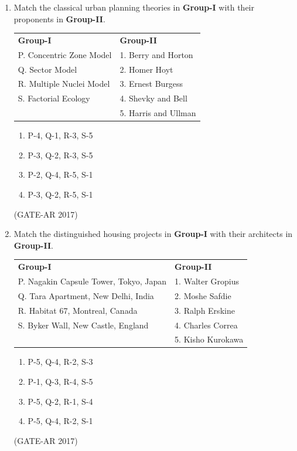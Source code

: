 \documentclass[a4paper,10pt]{article}
\begin{document}
\begin{enumerate}
    \item Match the classical urban planning theories in \textbf{Group-I} with their proponents in \textbf{Group-II}. \\
    \begin{tabular}{ l l }
	\textbf{Group-I} & \textbf{Group-II} \\
	P. Concentric Zone Model & 1. Berry and Horton \\
	Q. Sector Model & 2. Homer Hoyt \\
	R. Multiple Nuclei Model & 3. Ernest Burgess \\
	S. Factorial Ecology & 4. Shevky and Bell \\
	& 5. Harris and Ullman \\
	\end{tabular}
	\begin{multicols}{2}
	\begin{enumerate}
        \item P-4, Q-1, R-3, S-5
        \item P-3, Q-2, R-3, S-5
        \item P-2, Q-4, R-5, S-1
        \item P-3, Q-2, R-5, S-1
    \end{enumerate}
	\end{multicols}
    \hfill (GATE-AR 2017)

    \item Match the distinguished housing projects in \textbf{Group-I} with their architects in \textbf{Group-II}. \\
    \begin{tabular}{ l l }
	\textbf{Group-I} & \textbf{Group-II} \\
	P. Nagakin Capsule Tower, Tokyo, Japan & 1. Walter Gropius \\
	Q. Tara Apartment, New Delhi, India & 2. Moshe Safdie \\
	R. Habitat 67, Montreal, Canada & 3. Ralph Erskine \\
	S. Byker Wall, New Castle, England & 4. Charles Correa \\
	& 5. Kisho Kurokawa \\
	\end{tabular}
	\begin{multicols}{2}
	\begin{enumerate}
        \item P-5, Q-4, R-2, S-3
        \item P-1, Q-3, R-4, S-5
        \item P-5, Q-2, R-1, S-4
        \item P-5, Q-4, R-2, S-1
    \end{enumerate}
	\end{multicols}
    \hfill (GATE-AR 2017)


\end{enumerate}
\end{document}
